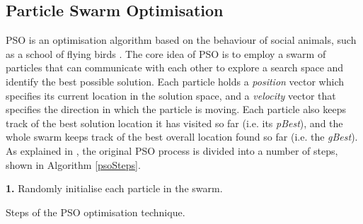 \documentclass{llncs}
\begin{document}
\subsection{Particle Swarm Optimisation}

PSO is an optimisation algorithm based on the behaviour of social animals, such as a school of flying birds \cite{shi1998modified}. The core idea of PSO is to employ a swarm of particles that can communicate with each other to explore a search space and identify the best possible solution. Each particle holds a \textit{position} vector which specifies its current location in the solution space, and a \textit {velocity} vector that specifies the direction in which the particle is moving. Each particle also keeps track of the best solution location it has visited so far (i.e. its \textit{pBest}), and the whole swarm keeps track of the best overall location found so far (i.e. the \textit{gBest}). As explained in \cite{eberhart2001particle}, the original PSO process is divided into a number of steps, shown in Algorithm \ref{psoSteps}.

\begin{algorithm}[h]
 \setlength{}
 \let\oldnl\nl%
\newcommand{\nonl}{\renewcommand{\nl}{\let\nl\oldnl}}
 \LinesNumbered
	\textbf{1.} Randomly initialise each particle in the swarm.\\
	\nonl {}
	
 \caption{Steps of the PSO optimisation technique.}
\label{psoSteps}
\end{algorithm}
\end{document}
